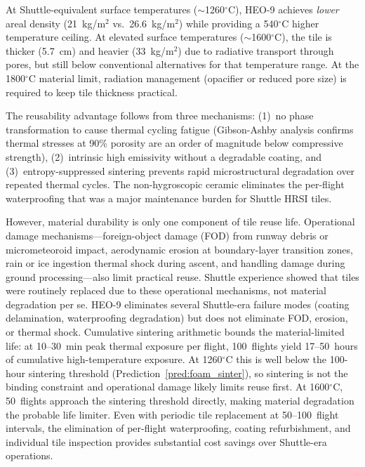\documentclass[12pt,letterpaper]{article}
\theoremstyle{definition}
\begin{document}
At Shuttle-equivalent surface temperatures ($\sim$1260$^\circ$C), HEO-9 achieves \emph{lower} areal density (21~kg/m$^2$ vs.\ 26.6~kg/m$^2$) while providing a 540$^\circ$C higher temperature ceiling.  At elevated surface temperatures ($\sim$1600$^\circ$C), the tile is thicker (5.7~cm) and heavier (33~kg/m$^2$) due to radiative transport through pores, but still below conventional alternatives for that temperature range.  At the 1800$^\circ$C material limit, radiation management (opacifier or reduced pore size) is required to keep tile thickness practical.

The reusability advantage follows from three mechanisms: (1)~no phase transformation to cause thermal cycling fatigue (Gibson-Ashby analysis confirms thermal stresses at 90\% porosity are an order of magnitude below compressive strength), (2)~intrinsic high emissivity without a degradable coating, and (3)~entropy-suppressed sintering prevents rapid microstructural degradation over repeated thermal cycles.  The non-hygroscopic ceramic eliminates the per-flight waterproofing that was a major maintenance burden for Shuttle HRSI tiles.

However, material durability is only one component of tile reuse life.  Operational damage mechanisms---foreign-object damage (FOD) from runway debris or micrometeoroid impact, aerodynamic erosion at boundary-layer transition zones, rain or ice ingestion thermal shock during ascent, and handling damage during ground processing---also limit practical reuse.  Shuttle experience showed that tiles were routinely replaced due to these operational mechanisms, not material degradation per se.  HEO-9 eliminates several Shuttle-era failure modes (coating delamination, waterproofing degradation) but does not eliminate FOD, erosion, or thermal shock.  Cumulative sintering arithmetic bounds the material-limited life: at 10--30~min peak thermal exposure per flight, 100~flights yield 17--50~hours of cumulative high-temperature exposure.  At 1260$^\circ$C this is well below the 100-hour sintering threshold (Prediction~\ref{pred:foam_sinter}), so sintering is not the binding constraint and operational damage likely limits reuse first.  At 1600$^\circ$C, 50~flights approach the sintering threshold directly, making material degradation the probable life limiter.  Even with periodic tile replacement at 50--100~flight intervals, the elimination of per-flight waterproofing, coating refurbishment, and individual tile inspection provides substantial cost savings over Shuttle-era operations.
\end{document}

